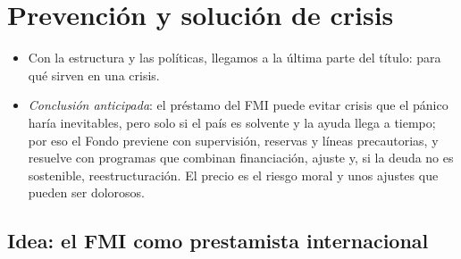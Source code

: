 \documentclass[11pt]{article}
\begin{document}
\section{Prevención y solución de crisis}\label{sec:crisis}

\begin{itemize}
\item Con la estructura y las políticas, llegamos a la última parte del título: para qué sirven en una crisis.
\item \emph{Conclusión anticipada}: el préstamo del FMI puede evitar crisis que el pánico haría inevitables, pero solo si el país es solvente y la ayuda llega a tiempo; por eso el Fondo previene con supervisión, reservas y líneas precautorias, y resuelve con programas que combinan financiación, ajuste y, si la deuda no es sostenible, reestructuración. El precio es el riesgo moral y unos ajustes que pueden ser dolorosos.
\end{itemize}

\subsection{Idea: el FMI como prestamista internacional}\label{sec:idea-crisis}
\end{document}
